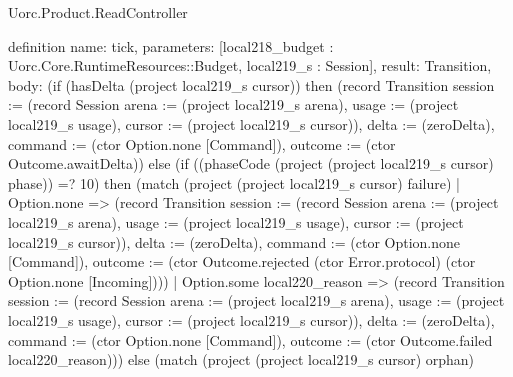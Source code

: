 \begin{lexlean}{Uorc.Product.ReadController}
\begin{semanticmodule}
definition{
  name: tick,
  parameters: [local218_budget : Uorc.Core.RuntimeResources::Budget, local219_s : Session],
  result: Transition,
  body: (if (hasDelta (project local219_s cursor)) then (record Transition {session := (record Session {arena := (project local219_s arena), usage := (project local219_s usage), cursor := (project local219_s cursor)}), delta := (zeroDelta), command := (ctor Option.none [Command]), outcome := (ctor Outcome.awaitDelta)}) else (if ((phaseCode (project (project local219_s cursor) phase)) =? 10) then (match (project (project local219_s cursor) failure)
    | Option.none => (record Transition {session := (record Session {arena := (project local219_s arena), usage := (project local219_s usage), cursor := (project local219_s cursor)}), delta := (zeroDelta), command := (ctor Option.none [Command]), outcome := (ctor Outcome.rejected (ctor Error.protocol) (ctor Option.none [Incoming]))})
    | Option.some local220_reason => (record Transition {session := (record Session {arena := (project local219_s arena), usage := (project local219_s usage), cursor := (project local219_s cursor)}), delta := (zeroDelta), command := (ctor Option.none [Command]), outcome := (ctor Outcome.failed local220_reason)})) else (match (project (project local219_s cursor) orphan)
}
\end{semanticmodule}
\end{lexlean}
